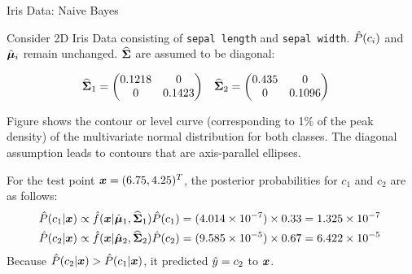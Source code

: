 \begin{frame}{Iris Data: Naive Bayes}

Consider 2D Iris Data consisting of \texttt{sepal length} and \texttt{sepal width}.  $\hat{P}(c_i)$ and $\hat{{\bm \mu}}_i$ remain unchanged.  $\widehat{{\bm \Sigma}}$ are assumed to be diagonal: 

    \begin{align*}
        \widehat{{\bm \Sigma}}_1 & = \begin{pmatrix} 0.1218 & 0 \\ 0 & 0.1423  \end{pmatrix}
        & \widehat{{\bm \Sigma}}_2 & = \begin{pmatrix} 0.435 & 0 \\ 0 & 0.1096  \end{pmatrix}
    \end{align*}

    F{i}gure shows the contour or level
    curve (corresponding to 1\% of the peak density) of the
    multivariate normal distribution for both classes. 
    The diagonal assumption leads to contours that
    are axis-parallel ellipses.

\medskip

    For the test point ${\boldsymbol x} = (6.75,4.25)^T$, the posterior
    probabilities for $c_1$ and $c_2$ are as follows:
    \begin{align*}
        \hat{P}(c_1|{\boldsymbol x}) & \propto \kern3pt\hat{\kern-3pt f}({\boldsymbol x}|\hat{{\bm \mu}}_1,\widehat{{\bm \Sigma}}_1) \hat{P}(c_1) =
        (4.014 \times 10^{-7}) \times 0.33 = 1.325 \times
        10^{-7}\\
        \hat{P}(c_2|{\boldsymbol x}) & \propto \kern3pt\hat{\kern-3pt f}({\boldsymbol x}|\hat{{\bm \mu}}_2,\widehat{{\bm \Sigma}}_2) \hat{P}(c_2) =
        (9.585 \times 10^{-5}) \times 0.67 = 6.422 \times
        10^{-5}\
    \end{align*}
    Because $\hat{P}(c_2|{\boldsymbol x}) > \hat{P}(c_1|{\boldsymbol x})$, it predicted $\hat{y} = c_2$ to ${\boldsymbol x}$.

\end{frame}

